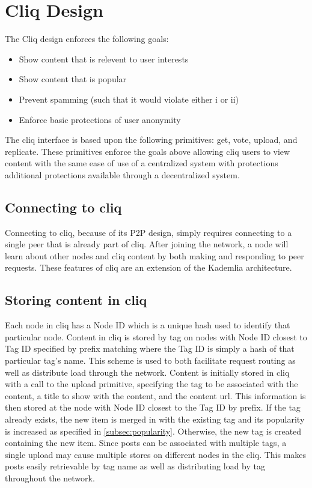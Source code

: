 \documentclass[11pt,twocolumn]{article}
\begin{document}
\section{Cliq Design}

The Cliq design enforces the following goals: 

\begin{itemize}
\item Show content that is relevent to user interests
\item Show content that is popular
\item Prevent spamming (such that it would violate either i or ii)
\item Enforce basic protections of user anonymity
\end{itemize}

The cliq interface is based upon the following primitives: get, vote, upload, and replicate. 
These primitives enforce the goals above allowing cliq users to view content with the same ease of use of a centralized system with protections additional protections available through a decentralized system. 

\subsection{Connecting to cliq}

Connecting to cliq, because of its P2P design, simply requires connecting to a single peer that is already part of cliq. 
After joining the network, a node will learn about other nodes and cliq content by both making and responding to peer requests. 
These features of cliq are an extension of the Kademlia architecture.

\subsection{Storing content in cliq}
\label{subsec:upload}

Each node in cliq has a Node ID which is a unique hash used to identify that particular node. 
Content in cliq is stored by tag on nodes with Node ID closest to Tag ID specified by prefix matching where the Tag ID is simply a hash of that particular tag's name. 
This scheme is used to both facilitate request routing as well as distribute load through the network. 
Content is initially stored in cliq with a call to the upload primitive, specifying the tag to be associated with the content, a title to show with the content, and the content url. 
This information is then stored at the node with Node ID closest to the Tag ID by prefix. 
If the tag already exists, the new item is merged in with the existing tag and its popularity is increased as specified in \ref{subsec:popularity}. 
Otherwise, the new tag is created containing the new item. 
Since posts can be associated with multiple tags, a single upload may cause multiple stores on different nodes in the cliq. 
This makes posts easily retrievable by tag name as well as distributing load by tag throughout the network. 
\end{document}
